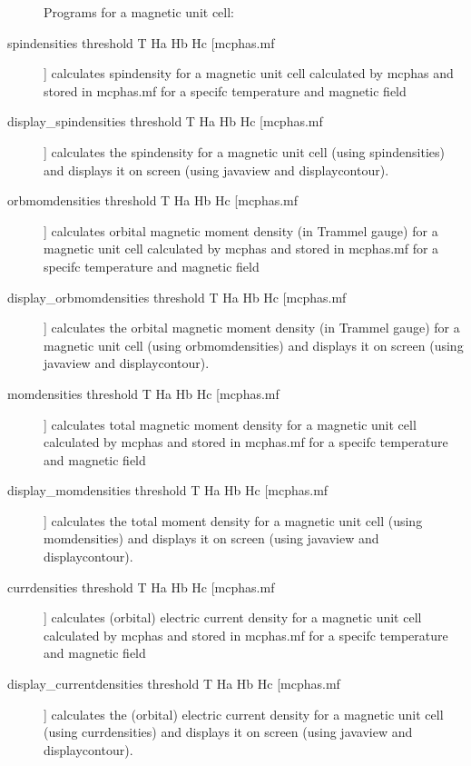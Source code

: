 \begin{description}
Programs for a magnetic unit cell:
\item [spindensities threshold T Ha Hb Hc [mcphas.mf]]
 calculates spindensity for a magnetic unit cell calculated by {\prg mcphas} and
 stored in {\prg mcphas.mf} for a specifc temperature and magnetic field
\item [display\_spindensities threshold T Ha Hb Hc [mcphas.mf]]
 calculates the spindensity for a magnetic unit cell (using {\prg spindensities})
 and displays it on screen (using {\prg javaview} and {\prg displaycontour}).
\item [orbmomdensities threshold T Ha Hb Hc [mcphas.mf]]
 calculates orbital magnetic moment density (in Trammel gauge) for a magnetic unit cell calculated by {\prg mcphas} and
 stored in {\prg mcphas.mf} for a specifc temperature and magnetic field
\item [display\_orbmomdensities threshold T Ha Hb Hc [mcphas.mf]]
 calculates the orbital magnetic moment 
density (in Trammel gauge) for a magnetic unit cell (using {\prg orbmomdensities})
 and displays it on screen (using {\prg javaview} and {\prg displaycontour}).
\item [momdensities threshold T Ha Hb Hc [mcphas.mf]]
 calculates total magnetic moment density for a magnetic unit 
cell calculated by {\prg mcphas} and
 stored in {\prg mcphas.mf} for a specifc temperature and magnetic field
\item [display\_momdensities threshold T Ha Hb Hc [mcphas.mf]]
 calculates the total moment density for a magnetic 
unit cell (using {\prg momdensities})
 and displays it on screen (using {\prg javaview} and {\prg displaycontour}).
\item [currdensities threshold T Ha Hb Hc [mcphas.mf]]
 calculates (orbital) electric current density for a magnetic unit cell calculated by {\prg mcphas} and
 stored in {\prg mcphas.mf} for a specifc temperature and magnetic field
\item [display\_currentdensities threshold T Ha Hb Hc [mcphas.mf]]
 calculates the (orbital) electric current 
density for a magnetic unit cell (using {\prg currdensities})
 and displays it on screen (using {\prg javaview} and {\prg displaycontour}).
\end{description}


